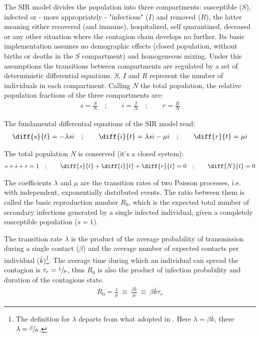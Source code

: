 \documentclass[DIV=12, BCOR=0pt]{scrartcl}  %
\begin{document}
  The SIR model divides the population into three compartments: susceptible ($S$), infected or - more appropriately - "infectious" ($I$) and removed ($R$), the latter meaning either recovered (and immune), hospitalized, self quarantined, deceased or any other situation where the contagion chain develops no further. Its basic implementation assumes no demographic effects (closed population, without births or deaths in the $S$ compartment) and homogeneous mixing. Under this assumptions the transitions between compartments are regulated by a set of deterministic differential equations. %
  $S$, $I$ and $R$ represent the number of individuals in each compartment.
  Calling $N$ the total population, the relative population fractions of the three compartments are:
  \begin{align}
			s = \frac{S}{N}  \quad;  \qquad 	 i = \frac{I}{N}  \quad;  \qquad 	 r = \frac{R}{N}
  \end{align}

  The fundamental differential equations of the SIR model read:
  \begin{align}
  	\diff{s}{t} = - \lambda s i \quad;  \qquad 	\diff{i}{t} = \lambda s i - \mu i \quad; \qquad  \diff{r}{t} = \mu i
  	\label{eq:sir}
  \end{align}

  The total population $N$ is conserved (it's a closed system):  
  \begin{align}
  	s + i + r = 1 \quad ; \qquad \diff{s}{t} + \diff{i}{t} + \diff{r}{t} = 0  \quad ; \qquad  \diff{N}{t}= 0
  	\label{eq:sir_sum}
  \end{align}

	The coefficients $\lambda$ and $\mu$ are the transition rates of two Poisson processes, i.e. with independent, exponentially distributed events. The ratio between them is called the basic reproduction number $R_0$, which is the expected total number of secondary infections generated by a single infected individual, given a completely susceptible population ($s=1$). 
	
	The transition rate $\lambda$ is the product of the average probability of transmission during a single contact ($\beta$) and the average number of expected contacts per individual ($\bar{k}$)\footnote{The definition for $\lambda$ departs from what adopted in \citet{PastorSatorras}. Here $\lambda = \beta \bar{k}$, there $\lambda = \sfrac{\beta}{\mu}$.}.
  The average time during which an individual can spread the contagion is $\tau_{r} = \sfrac{1}{\mu}$, thus $R_0$ is also the product of infection probability and duration of the contagious state. 
  \begin{align}
			R_0 = \frac{\lambda}{\mu} \ \equiv \ \frac{\beta \bar{k}}{\mu} \ \equiv \ \beta \bar{k} \tau_{r}
			\label{eq:R0}
  \end{align}
\end{document}
